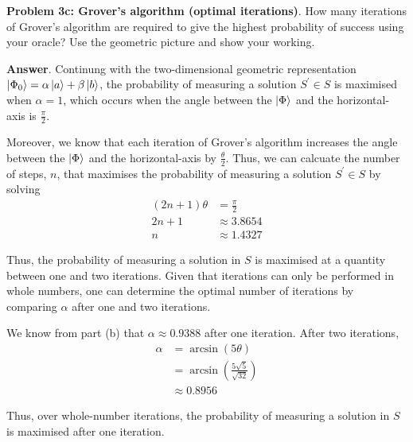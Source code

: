 \textbf{Problem 3c: Grover's algorithm (optimal iterations)}. How many iterations of Grover's algorithm are required to give the highest probability of success using your oracle? 
Use the geometric picture and show your working.


\textbf{Answer}. Continung with the two-dimensional geometric representation $\ket{\Phi_0} = \alpha \ket{a} + \beta \ket{b}$, 
the probability of measuring a solution $S^\prime \in S$ is maximised when $\alpha=1$, which occurs when the angle between the $\ket{\Phi}$ and the horizontal-axis is $\frac{\pi}{2}$.

Moreover, we know that each iteration of Grover's algorithm increases the angle between the $\ket{\Phi}$ and the horizontal-axis by $\frac{\theta}{2}$.
Thus, we can calcuate the number of steps, $n$, that maximises the probability of measuring a solution $S^\prime \in S$ by solving
\begin{align*}
	(2n + 1)\theta &= \frac{\pi}{2} \\
	2n + 1 &\approx 3.8654 \\
	n &\approx 1.4327
\end{align*} 

Thus, the probability of measuring a solution in $S$ is maximised at a quantity between one and two iterations. 
Given that iterations can only be performed in whole numbers, one can determine the optimal number of iterations by comparing $\alpha$ after one and two iterations.

We know from part (b) that $\alpha \approx 0.9388$ after one iteration.
After two iterations,
\begin{align*}
	\alpha &= \arcsin(5\theta) \\
	&= \arcsin(\frac{5\sqrt{5}}{\sqrt{32}}) \\
	&\approx 0.8956
\end{align*}

Thus, over whole-number iterations, the probability of measuring a solution in $S$ is maximised after one iteration.



